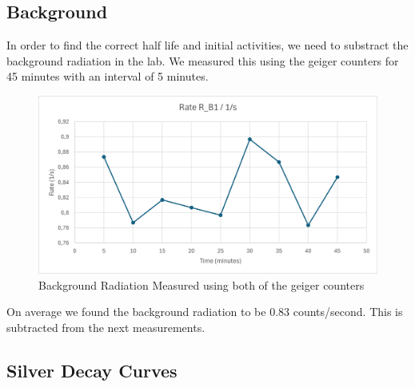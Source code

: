 \documentclass[12pt,a4paper]{article}
\begin{document}
\subsection{Background}
  In order to find the correct half life and initial activities, we need to substract the background radiation in the lab. We measured this using the geiger counters for 
  45 minutes with an interval of 5 minutes. 
  \begin{figure}[H]
    \centering
    \includegraphics{./Pictures/Background.png}
    \caption{Background Radiation Measured using both of the geiger counters}
    \label{fig:bk}
  \end{figure}

  On average we found the background radiation to be $0.83$ counts/second. This is subtracted from the next measurements. 

  \subsection{Silver Decay Curves}
\end{document}
